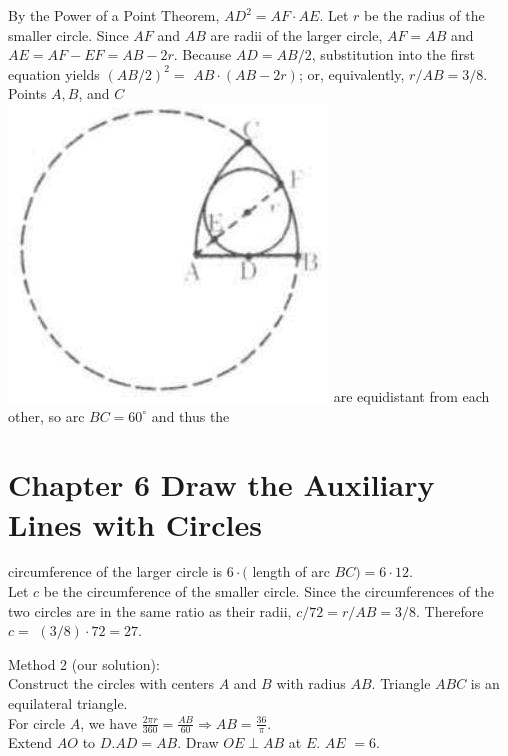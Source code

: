 \documentclass[10pt]{article}
\begin{document}
By the Power of a Point Theorem, \(A D^{2}=A F \cdot A E\). Let \(r\) be the radius of the smaller circle. Since \(A F\) and \(A B\) are radii of the larger circle, \(A F=A B\) and \(A E=A F-E F=A B-2 r\). Because \(A D=A B / 2\), substitution into the first equation yields \((A B / 2)^{2}=\) \(A B \cdot(A B-2 r)\); or, equivalently, \(r / A B=3 / 8\). Points \(A, B\), and \(C\)\\
\includegraphics[max width=\textwidth]{2025_04_17_97bc1f7e44d93c271a88g-212} are equidistant from each other, so arc \(B C=60^{\circ}\) and thus the

\section*{Chapter 6 Draw the Auxiliary Lines with Circles}
circumference of the larger circle is \(6 \cdot(\) length of arc \(B C)=6 \cdot 12\).\\
Let \(c\) be the circumference of the smaller circle. Since the circumferences of the two circles are in the same ratio as their radii, \(c / 72=r / A B=3 / 8\). Therefore \(c=\) \((3 / 8) \cdot 72=27\).

Method 2 (our solution):\\
Construct the circles with centers \(A\) and \(B\) with radius \(A B\). Triangle \(A B C\) is an equilateral triangle.\\
For circle \(A\), we have \(\frac{2 \pi r}{360}=\frac{A B}{60} \Rightarrow A B=\frac{36}{\pi}\).\\
Extend \(A O\) to \(D . A D=A B\). Draw \(O E \perp A B\) at \(E\). \(A E\) \(=6\).
\end{document}
